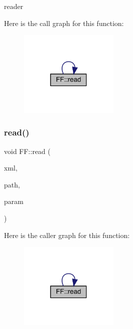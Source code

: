 reader 

Here is the call graph for this function\+:
\nopagebreak
\begin{figure}[H]
\begin{center}
\leavevmode
\includegraphics[width=134pt]{d5/da6/namespaceFF_a4e59e8e764d20bb787e2992c247ca80f_cgraph}
\end{center}
\end{figure}
\mbox{\label{namespaceFF_a4e59e8e764d20bb787e2992c247ca80f}} 
\subsubsection{\texorpdfstring{read()}{read()}\hspace{0.1cm}{\footnotesize\ttfamily [9/15]}}
{\footnotesize\ttfamily void F\+F\+::read (\begin{DoxyParamCaption}\item[{X\+M\+L\+Reader \&}]{xml,  }\item[{const std\+::string \&}]{path,  }\item[{\mbox{\hyperlink{structFF_1_1DiscoKeyOperator__t}{Disco\+Key\+Operator\+\_\+t}} \&}]{param }\end{DoxyParamCaption})}

Here is the caller graph for this function\+:\nopagebreak
\begin{figure}[H]
\begin{center}
\leavevmode
\includegraphics[width=134pt]{d5/da6/namespaceFF_a4e59e8e764d20bb787e2992c247ca80f_icgraph}
\end{center}
\end{figure}
\mbox{\label{namespaceFF_a09293bf4dc7954334e338c256b1efc75}} 
